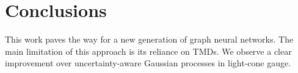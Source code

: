 \section{Conclusions}\label{sec:conclusions}

This work paves the way for a new generation of graph neural networks.
The main limitation of this approach is its reliance on TMDs. We observe
a clear improvement over uncertainty-aware Gaussian processes in
light-cone gauge.

